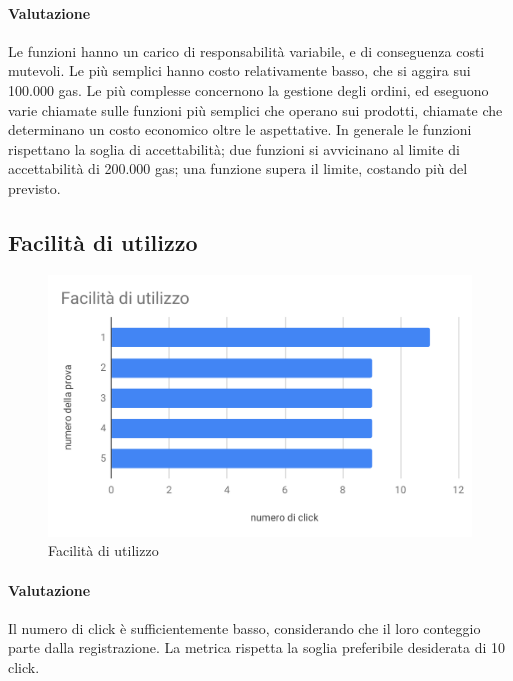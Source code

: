 \paragraph*{Valutazione}
Le funzioni hanno un carico di responsabilità variabile, e di conseguenza costi mutevoli.
Le più semplici hanno costo relativamente basso, che si aggira sui 100.000 gas. 
Le più complesse concernono la gestione degli ordini, ed eseguono varie chiamate sulle funzioni più semplici che operano sui prodotti, chiamate che determinano un costo economico oltre le aspettative.
In generale le funzioni rispettano la soglia di accettabilità; due funzioni si avvicinano al limite di accettabilità di 200.000 gas; una funzione supera il limite, costando più del previsto.

\subsection{Facilità di utilizzo}
\begin{figure}[H]
	\centering
	\includegraphics[scale=0.6]{res/images/RA/facilita-di-utilizzo.pdf}
	\caption{Facilità di utilizzo}
\end{figure}
\paragraph*{Valutazione}
Il numero di click è sufficientemente basso, considerando che il loro conteggio parte dalla registrazione.
La metrica rispetta la soglia preferibile desiderata di 10 click.

